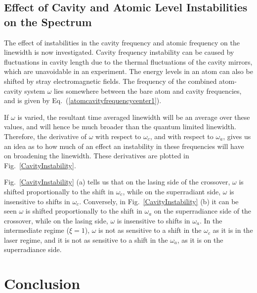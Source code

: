 \documentclass[aps,
twocolumn,
superscriptaddress,groupedaddress]{revtex4}
\begin{document}
{\subsection{Effect of Cavity and Atomic Level Instabilities on the
Spectrum}

The effect of instabilities in the cavity frequency and atomic frequency
on the linewidth is now investigated. Cavity frequency instability can
be caused by fluctuations in cavity length due to the thermal
fluctuations of the cavity mirrors, which are unavoidable in an
experiment. The energy levels in an atom can also be shifted by stray
electromagnetic fields. The frequency of the combined atom-cavity system
$\omega$ lies somewhere between the bare atom and cavity frequencies,
and is given by Eq.~(\ref{atomcavityfrequencycenter1}).

If $\omega$ is varied, the resultant time averaged linewidth will be an
average over these values, and will hence be much broader than the
quantum limited linewidth. Therefore, the derivative of  $\omega$ with
respect to $\omega_c$, and with respect to $\omega_a$, gives us an idea
as to how much of an effect an instability in these frequencies will
have on broadening the linewidth. These derivatives are plotted in
Fig.~\ref{CavityInstability}.

Fig.~\ref{CavityInstability} (a) tells us that on the lasing side of the
crossover, $\omega$ is shifted proportionally to the shift in
$\omega_c$, while on the superradiant side, $\omega$ is insensitive to
shifts in $\omega_c$.  Conversely, in Fig.~\ref{CavityInstability} (b)
it can be seen $\omega$ is shifted proportionally to the shift in
$\omega_a$ on the superradiance side of the crossover, while on the
lasing side, $\omega$ is insensitive to shifts in $\omega_a$. In the
intermediate regime ($\xi=1$), $\omega$ is not as sensitive to a shift
in the $\omega_c$ as it is in the laser regime, and it is not as
sensitive to a shift in the $\omega_a$, as it is on the superradiance
side.

\section{Conclusion}

}
\end{document}
